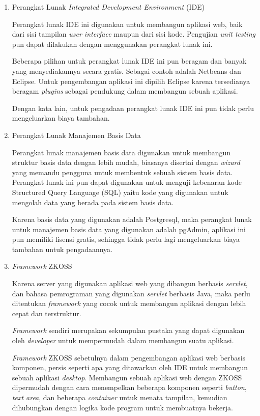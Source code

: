 \documentclass[pdftex,12pt, oneside]{article}
\begin{document}
\begin{enumerate}[1.]
  \item Perangkat Lunak \textit{Integrated Development Environment} (IDE)
  
Perangkat lunak IDE ini digunakan untuk membangun aplikasi web, baik dari sisi tampilan \textit{user interface} maupun dari sisi kode. Pengujian \textit{unit testing} pun dapat dilakukan dengan menggunakan perangkat lunak ini.

Beberapa pilihan untuk perangkat lunak IDE ini pun beragam dan banyak yang menyediakannya secara gratis. Sebagai contoh adalah Netbeans dan Eclipse. Untuk pengembangan aplikasi ini dipilih Eclipse karena tersedianya beragam \textit{plugins} sebagai pendukung dalam membangun sebuah aplikasi.

Dengan kata lain, untuk pengadaan perangkat lunak IDE ini pun tidak perlu mengeluarkan biaya tambahan.
  
  \item Perangkat Lunak Manajemen Basis Data
 
Perangkat lunak manajemen basis data digunakan untuk membangun struktur basis data dengan lebih mudah, biasanya disertai dengan \textit{wizard} yang memandu pengguna untuk membentuk sebuah sistem basis data. Perangkat lunak ini pun dapat digunakan untuk menguji kebenaran kode Structured Query Language (SQL) yaitu kode yang digunakan untuk mengolah data yang berada pada sistem basis data.

Karena basis data yang digunakan adalah Postgresql, maka perangkat lunak untuk manajemen basis data yang digunakan adalah pgAdmin, aplikasi ini pun memiliki lisensi gratis, sehingga tidak perlu lagi mengeluarkan biaya tambahan untuk pengadaannya.
  
  \item \textit{Framework} ZKOSS
  
Karena server yang digunakan aplikasi web yang dibangun berbasis \textit{servlet}, dan bahasa pemrograman yang digunakan \textit{servlet} berbasis Java, maka perlu ditentukan \textit{framework} yang cocok untuk membangun aplikasi dengan lebih cepat dan terstruktur.

\textit{Framework} sendiri merupakan sekumpulan pustaka yang dapat digunakan oleh \textit{developer} untuk mempermudah dalam membangun suatu aplikasi.

\textit{Framework} ZKOSS sebetulnya dalam pengembangan aplikasi web berbasis komponen, persis seperti apa yang ditawarkan oleh IDE untuk membangun sebuah aplikasi \textit{desktop}. Membangun sebuah aplikasi web dengan ZKOSS dipermudah dengan cara menempelkan beberapa komponen seperti \textit{button}, \textit{text area}, dan beberapa \textit{container} untuk menata tampilan, kemudian dihubungkan dengan logika kode program untuk membuatnya bekerja.


\end{enumerate}
\end{document}
